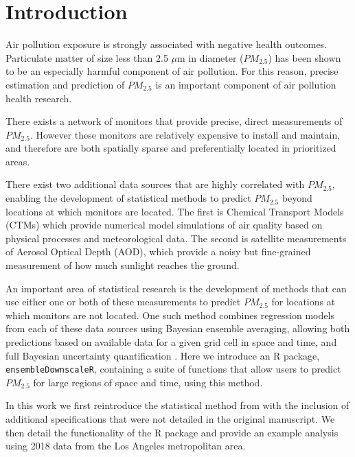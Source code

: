 
\section*{Introduction}

Air pollution exposure is strongly associated with negative health outcomes. 
Particulate matter of size less than 2.5 $\mu$m in diameter ($PM_{2.5}$) has been shown to be an especially harmful component of air pollution. 
For this reason, precise estimation and prediction of $PM_{2.5}$ is an important component of air pollution health research.  

There exists a network of monitors that provide precise, direct measurements of $PM_{2.5}$. 
However these monitors are relatively expensive to install and maintain, and therefore are both spatially sparse and preferentially located in prioritized areas. 

There exist two additional data sources that are highly correlated with $PM_{2.5}$, enabling the development of statistical methods to predict $PM_{2.5}$ beyond locations at which monitors are located. 
The first is Chemical Transport Models (CTMs) which provide numerical model simulations of air quality based on physical processes and meteorological data. 
The second is satellite measurements of Aerosol Optical Depth (AOD), which provide a noisy but fine-grained measurement of how much sunlight reaches the ground. 



An important area of statistical research is the development of methods that can use either one or both of these measurements to predict $PM_{2.5}$ for locations at which monitors are not located. 
One such method combines regression models from each of these data sources using Bayesian ensemble averaging, allowing both predictions based on available data for a given grid cell in space and time, and full Bayesian uncertainty quantification \cite{murray2019}. 
Here we introduce an R package, \texttt{ensembleDownscaleR}, containing a suite of functions that allow users to predict $PM_{2.5}$ for large regions of space and time, using this method.

In this work we first reintroduce the statistical method from \cite{murray2019} with the inclusion of additional specifications that were not detailed in the original manuscript. 
We then detail the functionality of the R package and provide an example analysis using 2018 data from the Los Angeles metropolitan area. 



